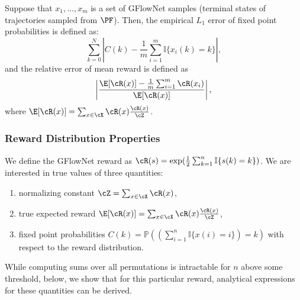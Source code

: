 Suppose that $x_1, \dots, x_m$ is a set of GFlowNet samples (terminal states of trajectories sampled from $\PF$). Then, the empirical $L_1$ error of fixed point probabilities is defined as:
$$
\sum_{k=0}^N \left| C(k) - \frac{1}{m}\sum_{i=1}^m \mathbb{I}\{x_i(k)=k\}\right|,
$$
and the relative error of mean reward is defined as 
$$
\left|\frac{\E[\cR(x)] - \frac{1}{m}\sum_{i=1}^m \cR(x_i)}{\E[\cR(x)]}\right|,
$$
where $\E[\cR(x)] = \sum_{x \in \cX} \cR(x) \frac{\cR(x)}{\cZ}$.

\subsubsection{Reward Distribution Properties}\label{app:exp_perms_vals}

We define the GFlowNet reward as $\cR(s) = \exp(\frac{1}{2}\sum_{k=1}^{n} \mathbb{I}\{s(k) = k\})$. We are interested in true values of three quantities:
\begin{enumerate}
    \item normalizing constant $\cZ = \sum_{x \in \cX} \cR(x)$,
    \item true expected reward $\E[\cR(x)] = \sum_{x \in \cX} \cR(x) \frac{\cR(x)}{\cZ}$,
    \item fixed point probabilities $C(k) = \mathbb{P}\left(\left(\sum_{i=1}^{n} \mathbb{I}\{x(i) = i\}\right) = k\right)$ with respect to the reward distribution.
\end{enumerate}

While computing sums over all permutations is intractable for $n$ above some threshold, below, we show that for this particular reward, analytical expressions for these quantities can be derived. 

